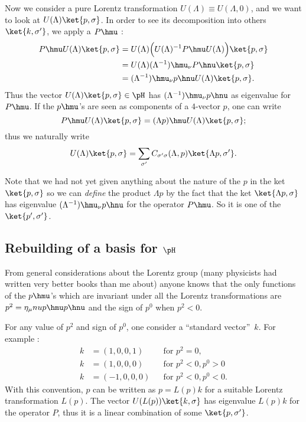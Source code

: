 Now we consider a pure Lorentz transformation $U(\Lambda)\equiv U(\Lambda,0)$, and we want to look at $U(\Lambda)\ket{p,\sigma}$. In order to see its decomposition into others $\ket{k,\sigma'}$, we apply a $P\hmu$ :
\begin{equation}
\begin{split}  
  P\hmu U(\Lambda)\ket{p,\sigma}&=U(\Lambda)\Big( U(\Lambda)^{-1} P\hmu U(\Lambda)  \Big)\ket{p,\sigma}\\
                                &=U(\Lambda) {(\Lambda^{-1})}\hmu_{\nu} P\hnu \ket{p,\sigma}\\
				&=(\Lambda^{-1})\hmu_{\nu} p\hnu U(\Lambda)\ket{p,\sigma}.
\end{split}				
\end{equation}
Thus the vector $U(\Lambda)\ket{p,\sigma}\in\pH$ has $(\Lambda^{-1})\hmu_{\nu} p\hnu$ as eigenvalue for $P\hmu$. If the $p\hmu$'s are seen as components of a $4$-vector $p$, one can write
\[
    P\hmu U(\Lambda)\ket{p,\sigma}=(\Lambda p)\hmu U(\Lambda)\ket{p,\sigma};
\]    
     thus we naturally write  
\begin{equation}     
  U(\Lambda)\ket{p,\sigma}=\sum_{\sigma'}C_{\sigma'\sigma}(\Lambda,p)\ket{\Lambda p,\sigma'}.
\end{equation}
       

Note that we had not yet given anything about the nature of the $p$ in the ket $\ket{p,\sigma}$ so we can \emph{define} the product $\Lambda p$ by the fact that the ket $\ket{\Lambda p,\sigma}$ has eigenvalue $(\Lambda^{-1})\hmu_{\nu} p\hnu$ for the operator $P\hmu$. So it is one of the $\ket{p',\sigma'}$.

\subsection{Rebuilding of a basis for \texorpdfstring{$\pH$}{H}}

From general considerations about the Lorentz group (many physicists had written very better books than me about) anyone knows that the only functions of the $p\hmu$'s  which are invariant under all the Lorentz transformations are $p^2=\eta_{\mu}nu p\hmu p\hnu$ and the sign of $p^0$ when $p^2< 0$.

For any value of $p^2$ and sign of $p^0$, one consider a ``standard vector''\ $k$. For example :
\begin{subequations}
\begin{align}
   k&=(1,0,0,1)&&\text{for }p^2=0,\\
   k&=(1,0,0,0)&&\text{for }p^2<0,p^0>0\\
   k&=(-1,0,0,0)&&\text{for }p^2<0,p^0<0.
\end{align}   
\end{subequations}
With this convention, $p$ can be written as $p=L(p)k$ for a suitable Lorentz transformation $L(p)$. The vector $U(L(p))\ket{k,\sigma}$ has eigenvalue $L(p)k$ for the operator $P$, thus it is a linear combination of some $\ket{p,\sigma'}$.

